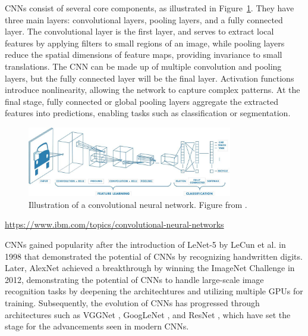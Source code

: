CNNs consist of several core components, as illustrated in Figure~\ref{fig:cnn_illustration}. They have three main layers: convolutional layers, pooling layers, and a fully connected layer. The convolutional layer is the first layer, and serves to extract local features by applying filters to small regions of an image, while pooling layers reduce the spatial dimensions of feature maps, providing invariance to small translations. The CNN can be made up of multiple convolution and pooling layers, but the fully connected layer will be the final layer. Activation functions introduce nonlinearity, allowing the network to capture complex patterns. At the final stage, fully connected or global pooling layers aggregate the extracted features into predictions, enabling tasks such as classification or segmentation.


\begin{figure}[ht]
    \centering
    \includegraphics[width=0.8\textwidth]{Images/CNN_illustration.jpg} 
    \caption{Illustration of a convolutional neural network. Figure from \cite{mathworks_cnn}. }
    \label{fig:cnn_illustration}
\end{figure}

\url{https://www.ibm.com/topics/convolutional-neural-networks}

CNNs gained popularity after the introduction of LeNet-5 by LeCun et al. in 1998 \cite{lecun1998} that demonstrated the potential of CNNs by recognizing handwritten digits. Later, AlexNet \cite{NIPS2012_c399862d} achieved a breakthrough by winning the ImageNet Challenge in 2012, demonstrating the potential of CNNs to handle large-scale image recognition tasks by deepening the architechtures and utilizing multiple GPUs for training. Subsequently, the evolution of CNNs has progressed through architectures such as VGGNet \cite{simonyan2015deepconvolutionalnetworkslargescale}, GoogLeNet \cite{szegedy2014goingdeeperconvolutions}, and ResNet \cite{he2016}, which have set the stage for the advancements seen in modern CNNs.


